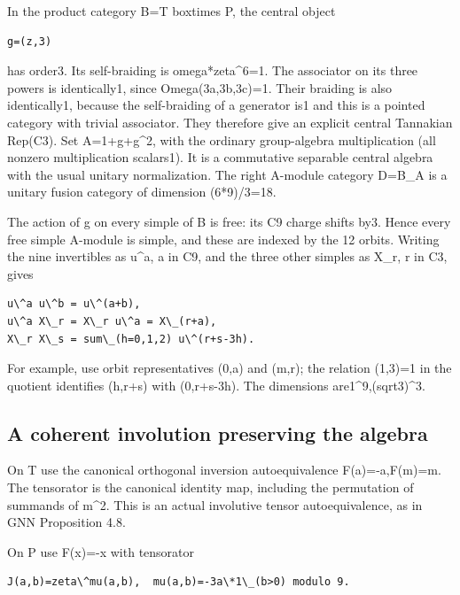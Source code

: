 In the product category B=T boxtimes P, the central object

\begin{verbatim}
g=(z,3)
\end{verbatim}

has order3. Its self-braiding is omega*zeta\^{}6=1. The associator on
its three powers is identically1, since Omega(3a,3b,3c)=1. Their
braiding is also identically1, because the self-braiding of a generator
is1 and this is a pointed category with trivial associator. They
therefore give an explicit central Tannakian Rep(C3). Set A=1+g+g\^{}2,
with the ordinary group-algebra multiplication (all nonzero
multiplication scalars1). It is a commutative separable central algebra
with the usual unitary normalization. The right A-module category D=B\_A
is a unitary fusion category of dimension (6*9)/3=18.

The action of g on every simple of B is free: its C9 charge shifts by3.
Hence every free simple A-module is simple, and these are indexed by the
12 orbits. Writing the nine invertibles as u\^{}a, a in C9, and the
three other simples as X\_r, r in C3, gives

\begin{verbatim}
u\^a u\^b = u\^(a+b),
u\^a X\_r = X\_r u\^a = X\_(r+a),
X\_r X\_s = sum\_(h=0,1,2) u\^(r+s-3h).
\end{verbatim}

For example, use orbit representatives (0,a) and (m,r); the relation
(1,3)=1 in the quotient identifies (h,r+s) with (0,r+s-3h). The
dimensions are1\^{}9,(sqrt3)\^{}3.

\hypertarget{a-coherent-involution-preserving-the-algebra}{%
\subsection{A coherent involution preserving the
algebra}\label{a-coherent-involution-preserving-the-algebra}}

On T use the canonical orthogonal inversion autoequivalence
F(a)=-a,F(m)=m. The tensorator is the canonical identity map, including
the permutation of summands of m\^{}2. This is an actual involutive
tensor autoequivalence, as in GNN Proposition 4.8.

On P use F(x)=-x with tensorator

\begin{verbatim}
J(a,b)=zeta\^mu(a,b),  mu(a,b)=-3a\*1\_(b>0) modulo 9.
\end{verbatim}

